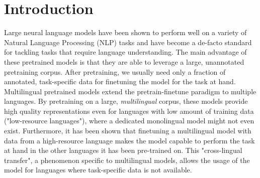 
\chapter{Introduction}
\label{chap:introduction}





Large neural language models have been shown to perform well on a variety of Natural Language Processing (NLP) tasks and have become a de-facto standard for tackling tasks that require language understanding. The main advantage of these pretrained models is that they are able to leverage a large, unannotated pretraining corpus. After pretraining, we usually need only a fraction of annotated, task-specific data for finetuning the model for the task at hand. \cite{devlin_bert_2019,radford_improving_nodate} Multilingual pretrained models extend the pretrain-finetune paradigm to multiple languages. By pretraining on a large, \textit{multilingual} corpus, these models provide high quality representations even for languages with low amount of training data ("low-resource languages"), where a dedicated monolingual model might not even exist. Furthermore, it has been shown that finetuning a multilingual model with data from a high-resource language makes the model capable to perform the task at hand in the other languages it has been pre-trained on. This "cross-lingual transfer", a phenomenon specific to multilingual models, allows the usage of the model for languages where task-specific data is not available. \cite{k_cross-lingual_2022,conneau_unsupervised_2020-1}

